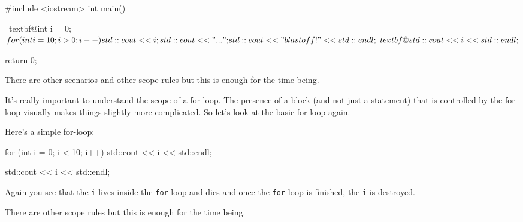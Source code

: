\begin{console}[commandchars=\~\@\$]
#include <iostream>
int main()
{
    ~textbf@int i = 0;$
    for (int i = 10; i > 0; i--)
    {   
        std::cout << i;
        std::cout << " ... ";
    }

    std::cout << "blast off!" << std::endl;
    ~textbf@std::cout << i << std::endl;$

    return 0;
}
\end{console}

There are other scenarios and other scope rules but this is enough for
the time being.

It's really important to understand the scope of a
for-loop. The presence of a block (and not just a statement) that is
controlled by the for-loop visually makes things slightly more
complicated. So let's look at the basic for-loop again.

\sidenote
{
}
Here's a simple for-loop:
\begin{console}
for (int i = 0; i < 10; i++)
    std::cout << i << std::endl;

std::cout << i << std::endl;
\end{console}

Again you see that the \texttt{i} lives inside the \texttt{for}-loop and
dies and once the \texttt{for}-loop is finished, the \texttt{i} is
destroyed.

There are other scope rules but this is enough for the time being.

\newpage{}

